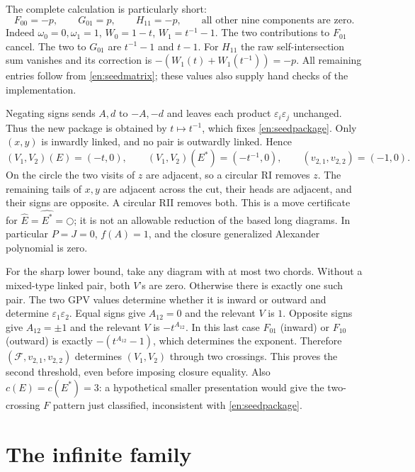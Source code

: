 \documentclass[12pt]{amsart}
\theoremstyle{definition}
\theoremstyle{remark}
\numberwithin{equation}{section}
\newcommand{\Package}{\mathcal F}
\newcommand{\clK}[1]{\widehat{#1}}
\newcommand{\eps}{\varepsilon}
\begin{document}
The complete calculation is particularly short:
\begin{equation}\label{en:seedpackage}
F_{00}=-p,\qquad G_{01}=p,\qquad H_{11}=-p,
\qquad\text{all other nine components are zero}.
\end{equation}
Indeed $\omega_0=0,\omega_1=1$, $W_0=1-t$, $W_1=t^{-1}-1$.
The two contributions to $F_{01}$ cancel. The two to $G_{01}$ are
$t^{-1}-1$ and $t-1$. For $H_{11}$ the raw self-intersection sum vanishes
and its correction is $-(W_1(t)+W_1(t^{-1}))=-p$.
All remaining entries follow from \eqref{en:seedmatrix}; these values
also supply hand checks of the implementation.

Negating signs sends $A,d$ to $-A,-d$ and leaves each product
$\eps_i\eps_j$ unchanged. Thus the new package is obtained by
$t\mapsto t^{-1}$, which fixes \eqref{en:seedpackage}. Only $(x,y)$
is inwardly linked, and no pair is outwardly linked. Hence
\[
(V_1,V_2)(E)=(-t,0),\qquad(V_1,V_2)(E^*)=(-t^{-1},0),
\qquad(v_{2,1},v_{2,2})=(-1,0).
\]
On the circle the two visits of $z$ are adjacent, so a circular RI removes
$z$. The remaining tails of $x,y$ are adjacent across the cut, their heads
are adjacent, and their signs are opposite. A circular RII removes both.
This is a move certificate for $\clK E=\clK {E^*}=\bigcirc$; it is not
an allowable reduction of the based long diagrams. In particular
$P=J=0$, $f(A)=1$, and the closure generalized Alexander polynomial is zero.

For the sharp lower bound, take any diagram with at most two chords.
Without a mixed-type linked pair, both $V$'s are zero. Otherwise there is
exactly one such pair. The two GPV values determine whether it is inward
or outward and determine $\eps_1\eps_2$. Equal signs give $A_{12}=0$
and the relevant $V$ is $1$. Opposite signs give $A_{12}=\pm1$ and the
relevant $V$ is $-t^{A_{12}}$. In this last case $F_{01}$ (inward) or
$F_{10}$ (outward) is exactly $-(t^{A_{12}}-1)$, which determines the
exponent. Therefore $(\Package,v_{2,1},v_{2,2})$ determines $(V_1,V_2)$
through two crossings. This proves the second threshold, even before
imposing closure equality. Also $c(E)=c(E^*)=3$: a hypothetical
smaller presentation would give the two-crossing $F$ pattern just
classified, inconsistent with \eqref{en:seedpackage}.

\section{The infinite family}
\end{document}
